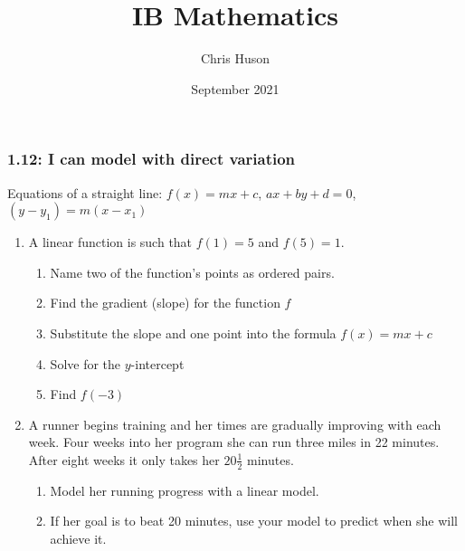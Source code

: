 \documentclass[12pt, twoside]{article}
\title{IB Mathematics}
\author{Chris Huson}
\date{September 2021}
\begin{document}
\subsubsection*{1.12: I can model with direct variation}
Equations of a straight line: $f(x)=mx+c$, $ax+by+d=0$, $(y-y_1)=m(x-x_1)$
\begin{enumerate}
\item A linear function is such that $f(1)=5$ and $f(5)=1$.
\begin{enumerate}[itemsep=1.5cm]
  \item Name two of the function's points as ordered pairs.
  \item Find the gradient (slope) for the function $f$
  \item Substitute the slope and one point into the formula $f(x)=mx+c$
  \item Solve for the $y$-intercept
  \item Find $f(-3)$
\end{enumerate} \vspace{1cm}

\item A runner begins training and her times are gradually improving with each week. Four weeks into her program she can run three miles in 22 minutes. After eight weeks it only takes her $20 \frac{1}{2}$ minutes.\begin{enumerate}
  \item Model her running progress with a linear model.\vspace{3cm}
  \item If her goal is to beat 20 minutes, use your model to predict when she will achieve it.
\end{enumerate}


\end{enumerate}
\end{document}
